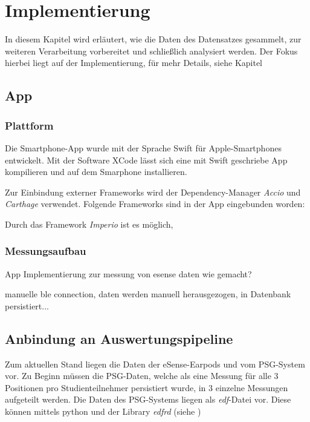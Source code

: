 \chapter{Implementierung}
\label{ch:Implementierung}

In diesem Kapitel wird erläutert, wie die Daten des Datensatzes gesammelt, zur weiteren Verarbeitung vorbereitet und schließlich analysiert werden.
Der Fokus hierbei liegt auf der Implementierung, für mehr Details, siehe Kapitel  %

\section{App}
\subsection{Plattform}
Die Smartphone-App wurde mit der Sprache Swift für Apple-Smartphones entwickelt. 
Mit der Software XCode lässt sich eine mit Swift geschriebe App kompilieren und auf dem Smarphone installieren.

Zur Einbindung externer Frameworks wird der Dependency-Manager \textit{Accio} und \textit{Carthage} verwendet.
Folgende Frameworks sind in der App eingebunden worden:

Durch das Framework \textit{Imperio} ist es möglich,

\subsection{Messungsaufbau}
App Implementierung zur messung von esense daten wie gemacht?

manuelle ble connection, daten werden manuell herausgezogen, in Datenbank persistiert... 



\section{Anbindung an Auswertungspipeline}
Zum aktuellen Stand liegen die Daten der eSense-Earpods und vom PSG-System vor. 
Zu Beginn müssen die PSG-Daten, welche als eine Messung für alle 3 Positionen pro Studienteilnehmer persistiert wurde, in 3 einzelne Messungen aufgeteilt werden.
Die Daten des PSG-Systems liegen als \textit{edf}-Datei vor. 
Diese können mittels python und der Library \textit{edfrd} (siehe )

